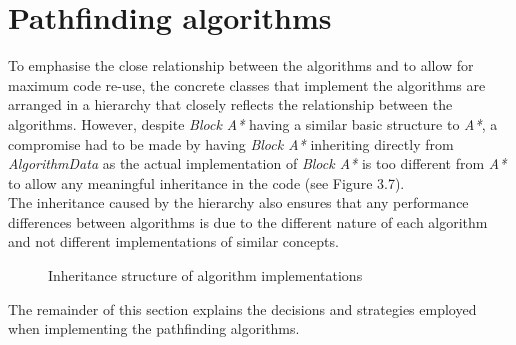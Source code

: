 \documentclass[12pt,notitlepage]{report}
\begin{document}
\section{Pathfinding algorithms}
To emphasise the close relationship between the algorithms and to allow for maximum code re-use, the concrete classes that implement the algorithms are arranged in a hierarchy that closely reflects the relationship between the algorithms. However, despite {\em Block A*} having a similar basic structure to {\em A*}, a compromise had to be made by having {\em Block A*} inheriting directly from {\em AlgorithmData} as the actual implementation of {\em Block A*} is too different from {\em A*} to allow any meaningful inheritance in the code (see Figure 3.7).\\

\noindent
The inheritance caused by the hierarchy also ensures that any performance differences between algorithms is due to the different nature of each algorithm and not different implementations of similar concepts.\\

\begin{figure}
\centering
{}
\caption{Inheritance structure of algorithm implementations}
\end{figure}

\noindent
The remainder of this section explains the decisions and strategies employed when implementing the pathfinding algorithms.
\end{document}
